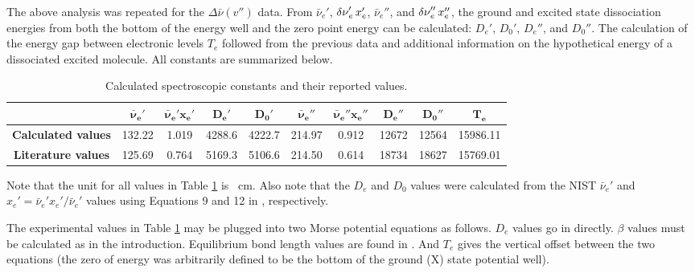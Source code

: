 \documentclass[../labs.tex]{subfiles}
\begin{document}
The above analysis was repeated for the $\Delta\bar{\nu}(v'')$ data. From $\bar{\nu}_e'$, $\var{\nu}_e'x_e'$, $\bar{\nu}_e''$, and $\var{\nu}_e''x_e''$, the ground and excited state dissociation energies from both the bottom of the energy well and the zero point energy can be calculated: $D_e'$, $D_0'$, $D_e''$, and $D_0''$. The calculation of the energy gap between electronic levels $T_e$ followed from the previous data and additional information on the hypothetical energy of a dissociated excited  molecule. All constants are summarized below.
\begin{table}[H]
    \centering
    \small
    \renewcommand{\arraystretch}{1.2}
    \begin{tabular}{|c|c|c|c|c|c|c|c|c|c|}
        \hline
         & $\bm{\bar{\nu}_e'}$ & $\bm{\bar{\nu}_e'x_e'}$ & $\bm{D_e'}$ & $\bm{D_0'}$ & $\bm{\bar{\nu}_e''}$ & $\bm{\bar{\nu}_e''x_e''}$ & $\bm{D_e''}$ & $\bm{D_0''}$ & $\bm{T_e}$\\
        \hline
        \textbf{Calculated values} & \num{132.22} & \num{1.019} & \num{4288.6} & \num{4222.7} & \num{214.97} & \num{0.912} & \num{12672} & \num{12564} & \num{15986.11}\\
        \hline
        \textbf{Literature values} & \num{125.69}\supercite{bib:NISTDiatomics} & \num{0.764}\supercite{bib:NISTDiatomics} & \num{5169.3} & \num{5106.6} & \num{214.50}\supercite{bib:NISTDiatomics} & \num{0.614}\supercite{bib:NISTDiatomics} & \num{18734} & \num{18627} & \num{15769.01}\supercite{bib:NISTDiatomics}\\
        \hline
    \end{tabular}
    \caption{Calculated spectroscopic constants and their reported values.}
    \label{tab:UVVisConstants3}
\end{table}
Note that the unit for all values in Table \ref{tab:UVVisConstants3} is \si{\per\centi\meter}. Also note that the $D_e$ and $D_0$ values were calculated from the NIST $\bar{\nu}_e'$ and $x_e'=\bar{\nu}_e'x_e'/\bar{\nu}_e'$ values using Equations 9 and 12 in \textcite{bib:LabManual}, respectively.\par
The experimental values in Table \ref{tab:UVVisConstants3} may be plugged into two Morse potential equations as follows. $D_e$ values go in directly. $\beta$ values must be calculated as in the introduction. Equilibrium bond length values are found in \textcite{bib:LabManual}. And $T_e$ gives the vertical offset between the two equations (the zero of energy was arbitrarily defined to be the bottom of the ground (X) state potential well).\par
\end{document}
